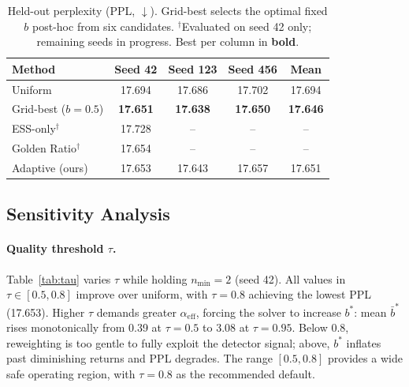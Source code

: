 \begin{table}[t]
\centering
\small
\begin{tabular}{@{}lcccc@{}}
\toprule
\textbf{Method} & \textbf{Seed 42} & \textbf{Seed 123} & \textbf{Seed 456} & \textbf{Mean} \\
\midrule
Uniform               & 17.694 & 17.686 & 17.702 & 17.694 \\
Grid-best ($b{=}0.5$) & \textbf{17.651} & \textbf{17.638} & \textbf{17.650} & \textbf{17.646} \\
ESS-only$^\dagger$     & 17.728 & --     & --     & --     \\
Golden Ratio$^\dagger$ & 17.654 & --     & --     & --     \\
\midrule
Adaptive (ours)        & 17.653 & 17.643 & 17.657 & 17.651 \\
\bottomrule
\end{tabular}
\caption{Held-out perplexity (PPL, $\downarrow$).
Grid-best selects the optimal fixed $b$ post-hoc from six candidates.
$^\dagger$Evaluated on seed 42 only; remaining seeds in progress.
Best per column in \textbf{bold}.}
\label{tab:main}
\end{table}

\subsection{Sensitivity Analysis}

\paragraph{Quality threshold $\tau$.}
Table~\ref{tab:tau} varies $\tau$ while holding $n_{\min} = 2$ (seed 42).
All values in $\tau \in [0.5, 0.8]$ improve over uniform, with $\tau = 0.8$ achieving the lowest PPL (17.653).
Higher $\tau$ demands greater $\alpha_{\mathrm{eff}}$, forcing the solver to increase $b^*$: mean $\bar{b}^*$ rises monotonically from 0.39 at $\tau{=}0.5$ to 3.08 at $\tau{=}0.95$.
Below 0.8, reweighting is too gentle to fully exploit the detector signal; above, $b^*$ inflates past diminishing returns and PPL degrades.
The range $[0.5, 0.8]$ provides a wide safe operating region, with $\tau = 0.8$ as the recommended default.

